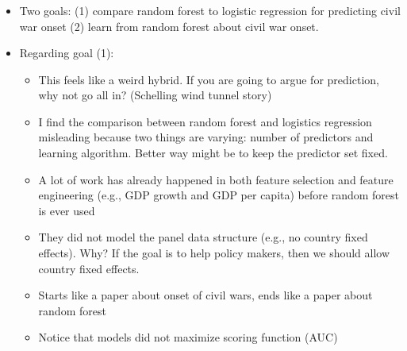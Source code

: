 \documentclass[aspectratio=169]{beamer}
\begin{document}
\begin{frame}
\frametitle{}

\begin{itemize}
\item Two goals: (1) compare random forest to logistic regression for predicting civil war onset (2) learn from random forest about civil war onset.
\pause
\item Regarding goal (1):
\begin{itemize}
\item This feels like a weird hybrid. If you are going to argue for prediction, why not go all in? (Schelling wind tunnel story)
\pause
\item I find the comparison between random forest and logistics regression misleading because two things are varying: number of predictors and learning algorithm. \pause Better way might be to keep the predictor set fixed.
\pause 
\item A lot of work has already happened in both feature selection and feature engineering (e.g., GDP growth and GDP per capita) before random forest is ever used
\pause
\item They did not model the panel data structure (e.g., no country fixed effects).  Why? If the goal is to help policy makers, then we should allow country fixed effects.
\pause
\item Starts like a paper about onset of civil wars, ends like a paper about random forest
\pause
\item Notice that models did not maximize scoring function (AUC)
\end{itemize}
\end{itemize}

\end{frame}
\end{document}

